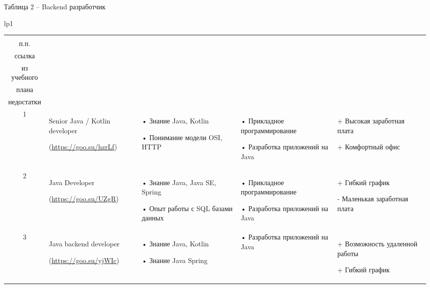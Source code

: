 \documentclass[14pt]{extreport}
\begin{document}
\begin{landscape}
\newpage
Таблица 2 – Backend разработчик
\begin{longtable}[H]{lp{1\linewidth}}

\caption{Backend разработчик}


\centering

\begin{small}


    \begin{tabular}{|c|p{}|p{6cm}|p{5cm}|p{5cm}|}
	\hline 
	\makecell{№ \\ п.п.} &	\makecell{Название должности,\\ ссылка} &	\makecell{Требования} & 	\makecell{Дисциплины \\ из учебного \\плана} &	\makecell{Преимущества и \\недостатки}  \\ 
	\hline 
	1	& Senior Java / Kotlin developer
	
(\url{https://goo.su/hzrLf}) &
•	Знание Java, Kotlin

•	Понимание модели OSI, HTTP &
•	Прикладное программирование

•	Разработка приложений на Java &
+	Высокая заработная плата


+	Комфортный офис

 \\

	\hline
	2	& Java Developer
	
(\url{https://goo.su/UZgR}) &
•	Знание Java, Java SE, Spring

•	Опыт работы с SQL базами данных

&

•	Прикладное программирование

•	Разработка приложений на Java &
+	Гибкий график


-	Маленькая заработная плата\\
	\hline 
	3	& Java backend developer
	
(\url{https://goo.su/yjWIc}) &
•	Знание Java, Kotlin

•	Знание Java Spring &

•	Разработка приложений на Java &
+	Возможность удаленной работы

+	Гибкий график
 \\


	\hline


    \end{tabular}
    \end{small}
\end{longtable}





\end{landscape}
\end{document}

